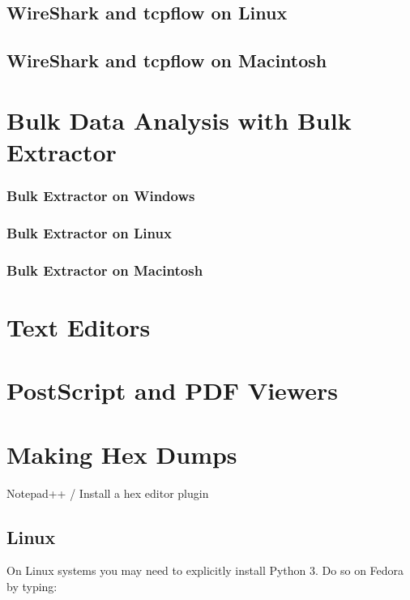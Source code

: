 \subsection{WireShark and tcpflow on Linux}
\subsection{WireShark and tcpflow on Macintosh}

\section{Bulk Data Analysis with Bulk Extractor}

\subsubsection{Bulk Extractor on Windows}
\subsubsection{Bulk Extractor on Linux}
\subsubsection{Bulk Extractor on Macintosh}


\section{Text Editors}\label{sec:text-editors}

\section{PostScript and PDF Viewers}


\section{Making Hex Dumps}

Notepad++ / Install a hex editor plugin

\subsection{Linux}
On Linux systems you may need to explicitly install Python 3. Do so on
Fedora by typing:

